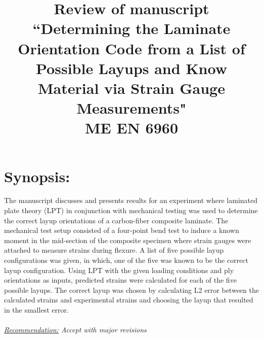 \documentclass[12pt]{article}
\begin{document}
\title{ Review of manuscript ``Determining the Laminate Orientation Code from a List of Possible Layups and Know Material via Strain Gauge Measurements" \\ \normalsize{ME EN 6960}}
\maketitle


\section{Synopsis:} 
The manuscript discusses and presents results for an experiment where laminated plate theory (LPT) in conjunction with mechanical testing was used to determine the correct layup orientations of a carbon-fiber composite laminate. The mechanical test setup consisted of a four-point bend test to induce a known moment in the mid-section of the composite specimen where strain gauges were attached to measure strains during flexure. A list of five possible layup configurations was given, in which, one of the five was known to be the correct layup configuration. Using LPT with the given loading conditions and ply orientations as inputs, predicted strains were calculated for each of the five possible layups. The correct layup was chosen by calculating L2 error between the calculated strains and experimental strains and choosing the layup that resulted in the smallest error.
\\ 
\\
\textit{\underline{Recommendation:} Accept with major revisions}
\end{document}
